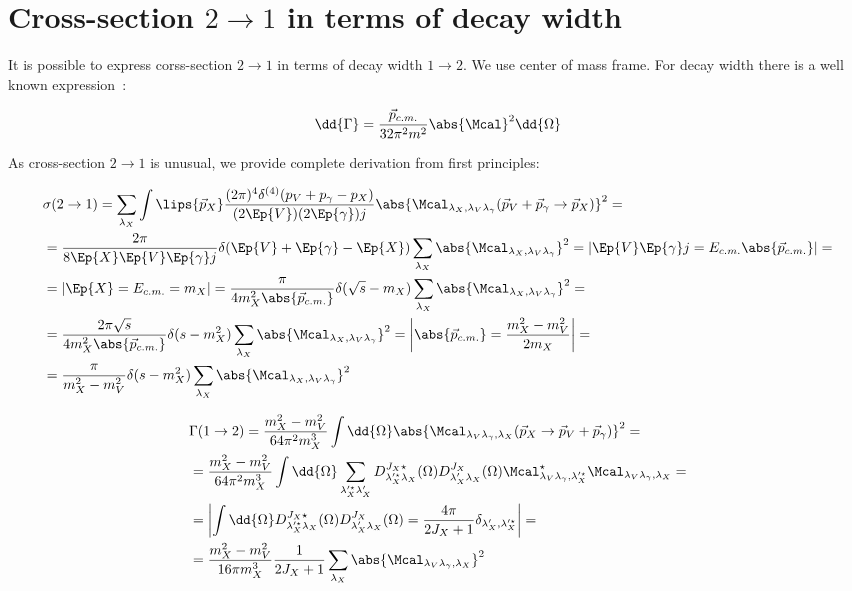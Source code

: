 \section{Cross-section $2 \rightarrow 1$ in terms of decay width} \label{sec:app:crsc-dw}

It is possible to express corss-section $2 \rightarrow 1$ in terms of decay width $1 \rightarrow 2$. We use center of mass frame. For decay width there is a well known expression~\cite{pdg}:

\begin{align}
    \dd{\Gamma} = \frac{\vec{p}_{c.m.}}{32 \pi^2 m^2} \abs{\Mcal}^2 \dd{\Omega}
\end{align}

As cross-section $2 \rightarrow 1$ is unusual, we provide complete derivation from first principles:

\begin{align}
        &\sigma(2 \rightarrow 1) = \sum_{\lambda_X} \int \lips{\vec{p}_X} \frac{(2\pi)^4 \delta^{(4)}(p_V + p_\gamma - p_X)}{(2 \Ep{V}) (2 \Ep{\gamma}) j} \abs{\Mcal_{\lambda_X, \lambda_V \lambda_\gamma}(\vec{p}_V + \vec{p}_\gamma \rightarrow \vec{p}_X)}^2 = \\
        &= \frac{2\pi}{8 \Ep{X} \Ep{V} \Ep{\gamma} j} \delta(\Ep{V} + \Ep{\gamma} - \Ep{X}) \sum_{\lambda_X} \abs{\Mcal_{\lambda_X, \lambda_V \lambda_\gamma}}^2 = \left| \Ep{V} \Ep{\gamma} j = E_{c.m.} \abs{\vec{p}_{c.m.}} \right| = \\
        &= \left| \Ep{X} = E_{c.m.} = m_X \right| = \frac{\pi}{4 m_X^2 \abs{\vec{p}_{c.m.}}} \delta(\sqrt{s} - m_X) \sum_{\lambda_X} \abs{\Mcal_{\lambda_X, \lambda_V \lambda_\gamma}}^2 = \\
        &= \frac{2 \pi \sqrt{s}}{4 m_X^2 \abs{\vec{p}_{c.m.}}} \delta(s - m_X^2) \sum_{\lambda_X} \abs{\Mcal_{\lambda_X, \lambda_V \lambda_\gamma}}^2 = \left| \abs{\vec{p}_{c.m.}} = \frac{m_X^2 - m_V^2}{2 m_X} \right| =\\
        &= \frac{\pi}{m_X^2 - m_V^2} \delta(s - m_X^2) \sum_{\lambda_X} \abs{\Mcal_{\lambda_X, \lambda_V \lambda_\gamma}}^2
\end{align}

\begin{align}
        &\Gamma(1 \rightarrow 2) =  \frac{m_X^2 - m_V^2}{64 \pi^2 m_X^3} \int \dd{\Omega} \abs{\Mcal_{\lambda_V \lambda_\gamma, \lambda_X}(\vec{p}_X \rightarrow \vec{p}_V + \vec{p}_\gamma)}^2 = \\
        &= \frac{m_X^2 - m_V^2}{64 \pi^2 m_X^3} \int \dd{\Omega} \sum_{\lambda_X^{\prime \star} \lambda_X^{\prime}} D^{J_X \star}_{\lambda^{\prime \star}_X \lambda_X}(\Omega) D^{J_X}_{\lambda^{\prime}_X \lambda_X}(\Omega) \Mcal^\star_{\lambda_V \lambda_\gamma, \lambda^{\prime \star}_X} \Mcal_{\lambda_V \lambda_\gamma, \lambda_X} = \\
        &= \left| \int \dd{\Omega}D^{J_X \star}_{\lambda^{\prime \star}_X \lambda_X}(\Omega) D^{J_X}_{\lambda^{\prime}_X \lambda_X}(\Omega) = \frac{4 \pi}{2J_X + 1} \delta_{\lambda_X^\prime, \lambda_X^{\prime \star}}  \right| = \\
        &= \frac{m_X^2 - m_V^2}{16 \pi m_X^3} \frac{1}{2J_X + 1} \sum_{\lambda_X} \abs{\Mcal_{\lambda_V \lambda_\gamma, \lambda_X}}^2
\end{align}

